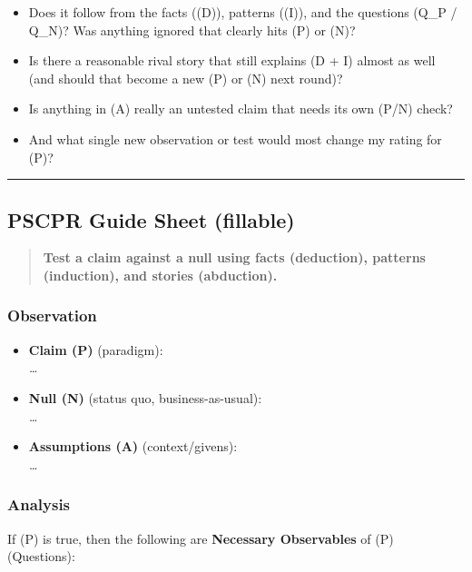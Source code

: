 \documentclass[
  letterpaper,
  DIV=11,
  numbers=noendperiod]{scrartcl}
\providecommand{\tightlist}{%
  \setlength{\itemsep}{0pt}\setlength{\parskip}{0pt}}
\begin{document}
\begin{itemize}
\tightlist
\item
  Does it follow from the facts ((D)), patterns ((I)), and the questions
  (Q\_P / Q\_N)? Was anything ignored that clearly hits (P) or (N)?
\item
  Is there a reasonable rival story that still explains (D + I) almost
  as well (and should that become a new (P) or (N) next round)?
\item
  Is anything in (A) really an untested claim that needs its own (P/N)
  check?
\item
  And what single new observation or test would most change my rating
  for (P)?
\end{itemize}

\begin{center}\rule{0.5\linewidth}{0.5pt}\end{center}

\subsection{PSCPR Guide Sheet
(fillable)}\label{pscpr-guide-sheet-fillable}

\begin{quote}
\textbf{Test a claim against a null using facts (deduction), patterns
(induction), and stories (abduction).}
\end{quote}

\subsubsection{Observation}\label{observation}

\begin{itemize}
\tightlist
\item
  \textbf{Claim (P)} (paradigm):\\
  \emph{\ldots{}}
\item
  \textbf{Null (N)} (status quo, business-as-usual):\\
  \emph{\ldots{}}
\item
  \textbf{Assumptions (A)} (context/givens):\\
  \emph{\ldots{}}
\end{itemize}

\subsubsection{Analysis}\label{analysis}

If (P) is true, then the following are \textbf{Necessary Observables} of
(P) (Questions):
\end{document}
